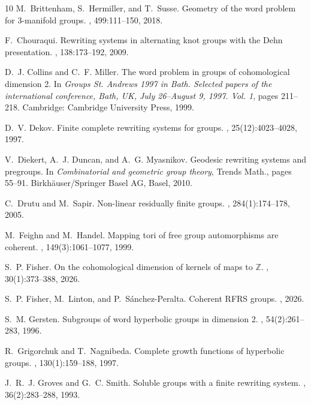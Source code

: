 \documentclass[12pt, a4paper]{amsart}
\theoremstyle{definition}
\begin{document}
\begin{thebibliography}{10}
M.~Brittenham, S.~Hermiller, and T.~Susse.
\newblock Geometry of the word problem for 3-manifold groups.
, 499:111--150, 2018.

F.~Chouraqui.
\newblock Rewriting systems in alternating knot groups with the {D}ehn
  presentation.
, 138:173--192, 2009.

D.~J. Collins and C.~F. Miller.
\newblock The word problem in groups of cohomological dimension 2.
\newblock In {\em Groups St. Andrews 1997 in Bath. Selected papers of the
  international conference, Bath, UK, July 26--August 9, 1997. Vol. 1}, pages
  211--218. Cambridge: Cambridge University Press, 1999.

D.~V. Dekov.
\newblock Finite complete rewriting systems for groups.
, 25(12):4023--4028, 1997.

V.~Diekert, A.~J. Duncan, and A.~G. Myasnikov.
\newblock Geodesic rewriting systems and pregroups.
\newblock In {\em Combinatorial and geometric group theory}, Trends Math.,
  pages 55--91. Birkh\"{a}user/Springer Basel AG, Basel, 2010.

C.~Drutu and M.~Sapir.
\newblock Non-linear residually finite groups.
, 284(1):174--178, 2005.

M.~Feighn and M.~Handel.
\newblock Mapping tori of free group automorphisms are coherent.
, 149(3):1061--1077, 1999.

S.~P. Fisher.
\newblock On the cohomological dimension of kernels of maps to $\mathbb{Z}$.
, 30(1):373--388, 2026.

S.~P. Fisher, M.~Linton, and P.~S{\'a}nchez-Peralta.
\newblock Coherent {RFRS} groups.
, 2026.

S.~M. Gersten.
\newblock Subgroups of word hyperbolic groups in dimension 2.
, 54(2):261--283, 1996.

R.~Grigorchuk and T.~Nagnibeda.
\newblock Complete growth functions of hyperbolic groups.
, 130(1):159--188, 1997.

J.~R.~J. Groves and G.~C. Smith.
\newblock Soluble groups with a finite rewriting system.
, 36(2):283--288, 1993.


\end{thebibliography}
\end{document}
